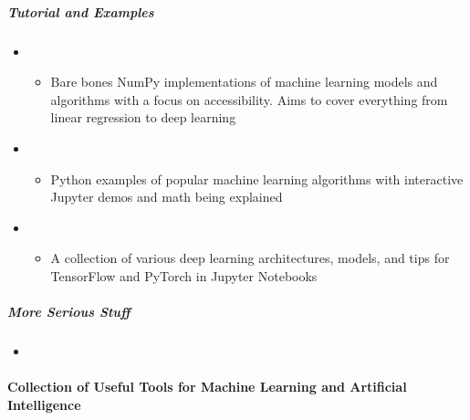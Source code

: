 \documentclass[letterpaper,10pt,english]{sphinxmanual}
\begin{document}
\subparagraph{Tutorial and Examples}
\label{\detokenize{resource/research/machine_learning/machine_learning_basic:tutorial-and-examples}}\begin{itemize}
\item {} 
\begin{itemize}
\item {} 
Bare bones NumPy implementations of machine learning models and
algorithms with a focus on accessibility. Aims to cover everything
from linear regression to deep learning

\end{itemize}

\item {} 
\begin{itemize}
\item {} 
Python examples of popular machine learning algorithms with
interactive Jupyter demos and math being explained

\end{itemize}

\item {} 
\begin{itemize}
\item {} 
A collection of various deep learning architectures, models, and
tips for TensorFlow and PyTorch in Jupyter Notebooks

\end{itemize}

\end{itemize}


\subparagraph{More Serious Stuff}
\label{\detokenize{resource/research/machine_learning/machine_learning_basic:more-serious-stuff}}\begin{itemize}
\item {} 

\end{itemize}


\paragraph{Collection of Useful Tools for Machine Learning and Artificial Intelligence}
\label{\detokenize{resource/research/machine_learning/machine_learning_tools:collection-of-useful-tools-for-machine-learning-and-artificial-intelligence}}\label{\detokenize{resource/research/machine_learning/machine_learning_tools::doc}}
\end{document}
